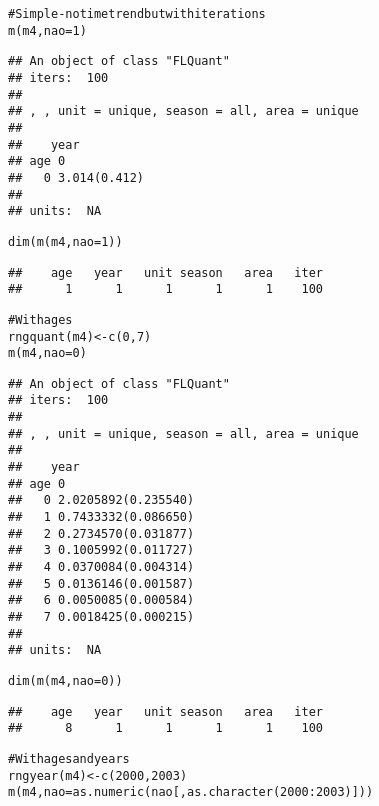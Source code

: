 \documentclass[a4paper,english,10pt]{article}\usepackage[]{graphicx}\usepackage[]{color}
\makeatletter
\newcommand{\hlnum}[1]{\textcolor[rgb]{0.2,0.2,0.2}{#1}}%
\newcommand{\hlcom}[1]{\textcolor[rgb]{0.2,0.267,0.4}{#1}}%
\newcommand{\hlopt}[1]{\textcolor[rgb]{0.2,0.2,0.2}{#1}}%
\newcommand{\hlstd}[1]{\textcolor[rgb]{0,0,0}{#1}}%
\newcommand{\hlkwb}[1]{\textcolor[rgb]{0.361,0.506,0.596}{#1}}%
\newcommand{\hlkwc}[1]{\textcolor[rgb]{0.361,0.506,0.596}{#1}}%
\newcommand{\hlkwd}[1]{\textcolor[rgb]{0.361,0.506,0.596}{#1}}%
\newenvironment{kframe}{%
 \def\at@end@of@kframe{}%
 \ifinner\ifhmode%
  \def\at@end@of@kframe{\end{minipage}}%
  \begin{minipage}{\columnwidth}%
 \fi\fi%
 \def\FrameCommand##1{\hskip\@totalleftmargin \hskip-\fboxsep
 \colorbox{shadecolor}{##1}\hskip-\fboxsep
     \hskip-\linewidth \hskip-\@totalleftmargin \hskip\columnwidth}%
 \MakeFramed {\advance\hsize-\width
   \@totalleftmargin\z@ \linewidth\hsize
   \@setminipage}}%
 {\par\unskip\endMakeFramed%
 \at@end@of@kframe}
\newenvironment{knitrout}{}{} %
\makeatother
\begin{document}
\begin{knitrout}
\color{fgcolor}\begin{kframe}
\begin{alltt}
\hlcom{# Simple - no time trend but with iterations}
\hlkwd{m}\hlstd{(m4,} \hlkwc{nao}\hlstd{=}\hlnum{1}\hlstd{)}
\end{alltt}
\begin{verbatim}
## An object of class "FLQuant"
## iters:  100 
## 
## , , unit = unique, season = all, area = unique
## 
##    year
## age 0           
##   0 3.014(0.412)
## 
## units:  NA
\end{verbatim}
\begin{alltt}
\hlkwd{dim}\hlstd{(}\hlkwd{m}\hlstd{(m4,} \hlkwc{nao}\hlstd{=}\hlnum{1}\hlstd{))}
\end{alltt}
\begin{verbatim}
##    age   year   unit season   area   iter 
##      1      1      1      1      1    100
\end{verbatim}
\begin{alltt}
\hlcom{# With ages}
\hlkwd{rngquant}\hlstd{(m4)} \hlkwb{<-} \hlkwd{c}\hlstd{(}\hlnum{0}\hlstd{,}\hlnum{7}\hlstd{)}
\hlkwd{m}\hlstd{(m4,} \hlkwc{nao}\hlstd{=}\hlnum{0}\hlstd{)}
\end{alltt}
\begin{verbatim}
## An object of class "FLQuant"
## iters:  100 
## 
## , , unit = unique, season = all, area = unique
## 
##    year
## age 0                  
##   0 2.0205892(0.235540)
##   1 0.7433332(0.086650)
##   2 0.2734570(0.031877)
##   3 0.1005992(0.011727)
##   4 0.0370084(0.004314)
##   5 0.0136146(0.001587)
##   6 0.0050085(0.000584)
##   7 0.0018425(0.000215)
## 
## units:  NA
\end{verbatim}
\begin{alltt}
\hlkwd{dim}\hlstd{(}\hlkwd{m}\hlstd{(m4,} \hlkwc{nao}\hlstd{=}\hlnum{0}\hlstd{))}
\end{alltt}
\begin{verbatim}
##    age   year   unit season   area   iter 
##      8      1      1      1      1    100
\end{verbatim}
\begin{alltt}
\hlcom{# With ages and years}
\hlkwd{rngyear}\hlstd{(m4)} \hlkwb{<-} \hlkwd{c}\hlstd{(}\hlnum{2000}\hlstd{,} \hlnum{2003}\hlstd{)}
\hlkwd{m}\hlstd{(m4,} \hlkwc{nao}\hlstd{=}\hlkwd{as.numeric}\hlstd{(nao[,}\hlkwd{as.character}\hlstd{(}\hlnum{2000}\hlopt{:}\hlnum{2003}\hlstd{)]))}
\end{alltt}

\end{kframe}
\end{knitrout}
\end{document}
